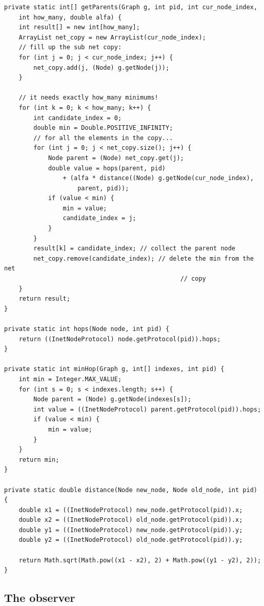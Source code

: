 \documentclass[a4paper,12pt]{article}
\begin{document}
\footnotesize
\begin{verbatim}
private static int[] getParents(Graph g, int pid, int cur_node_index,
    int how_many, double alfa) {
    int result[] = new int[how_many];
    ArrayList net_copy = new ArrayList(cur_node_index);
    // fill up the sub net copy:
    for (int j = 0; j < cur_node_index; j++) {
        net_copy.add(j, (Node) g.getNode(j));
    }

    // it needs exactly how_many minimums!
    for (int k = 0; k < how_many; k++) {
        int candidate_index = 0;
        double min = Double.POSITIVE_INFINITY;
        // for all the elements in the copy...
        for (int j = 0; j < net_copy.size(); j++) {
            Node parent = (Node) net_copy.get(j);
            double value = hops(parent, pid)
                + (alfa * distance((Node) g.getNode(cur_node_index),
                    parent, pid));
            if (value < min) {
                min = value;
                candidate_index = j;
            }
        }
        result[k] = candidate_index; // collect the parent node
        net_copy.remove(candidate_index); // delete the min from the net
                                                // copy
    }
    return result;
}

private static int hops(Node node, int pid) {
    return ((InetNodeProtocol) node.getProtocol(pid)).hops;
}

private static int minHop(Graph g, int[] indexes, int pid) {
    int min = Integer.MAX_VALUE;
    for (int s = 0; s < indexes.length; s++) {
        Node parent = (Node) g.getNode(indexes[s]);
        int value = ((InetNodeProtocol) parent.getProtocol(pid)).hops;
        if (value < min) {
            min = value;
        }
    }
    return min;
}

private static double distance(Node new_node, Node old_node, int pid) {
    double x1 = ((InetNodeProtocol) new_node.getProtocol(pid)).x;
    double x2 = ((InetNodeProtocol) old_node.getProtocol(pid)).x;
    double y1 = ((InetNodeProtocol) new_node.getProtocol(pid)).y;
    double y2 = ((InetNodeProtocol) old_node.getProtocol(pid)).y;

    return Math.sqrt(Math.pow((x1 - x2), 2) + Math.pow((y1 - y2), 2));
}
\end{verbatim}
\normalsize

\subsection{The observer}
\end{document}
